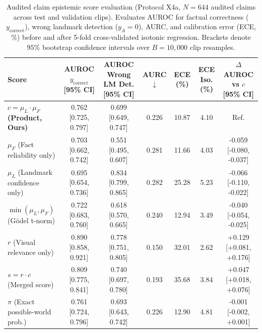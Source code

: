 \begin{table}[t]
\centering
\caption{Audited claim epistemic score evaluation (Protocol X4a, $N=644$ audited claims across test and validation clips). Evaluates AUROC for factual correctness ($y_{\text{correct}}$), wrong landmark detection ($y_A=0$), AURC, and calibration error (ECE, \%) before and after 5-fold cross-validated isotonic regression. Brackets denote $95\%$ bootstrap confidence intervals over $B=10{,}000$ clip resamples.}
\label{tab:x4a_score_comparison}
\small
\begin{tabular}{lcccccc}
\toprule
Score & AUROC $y_{\text{correct}}$ [95\% CI] & AUROC Wrong LM Det. [95\% CI] & AURC $\downarrow$ & ECE (\%) & ECE Iso. (\%) & $\Delta$ AUROC vs $c$ [95\% CI] \\
\midrule
\textbf{$c = \mu_L \cdot \mu_F$ (Product, Ours)} & 0.762 [0.725, 0.797] & 0.699 [0.649, 0.747] & 0.226 & 10.87 & 4.10 & Ref. \\
$\mu_F$ (Fact reliability only) & 0.703 [0.662, 0.742] & 0.551 [0.495, 0.607] & 0.281 & 11.66 & 4.03 & -0.059 [-0.080, -0.037] \\
$\mu_L$ (Landmark confidence only) & 0.695 [0.654, 0.736] & 0.834 [0.799, 0.865] & 0.282 & 25.28 & 5.23 & -0.066 [-0.110, -0.022] \\
$\min(\mu_L, \mu_F)$ (Gödel t-norm) & 0.722 [0.683, 0.760] & 0.618 [0.570, 0.665] & 0.240 & 12.94 & 3.49 & -0.040 [-0.054, -0.025] \\
$r$ (Visual relevance only) & 0.890 [0.858, 0.921] & 0.778 [0.751, 0.805] & 0.150 & 32.01 & 2.62 & +0.129 [+0.081, +0.176] \\
$s = r \cdot c$ (Merged score) & 0.809 [0.775, 0.841] & 0.740 [0.697, 0.780] & 0.193 & 35.68 & 3.84 & +0.047 [+0.018, +0.076] \\
$\pi$ (Exact possible-world prob.) & 0.761 [0.724, 0.796] & 0.693 [0.643, 0.742] & 0.226 & 12.90 & 4.81 & -0.001 [-0.002, +0.001] \\
\bottomrule
\end{tabular}
\end{table}
